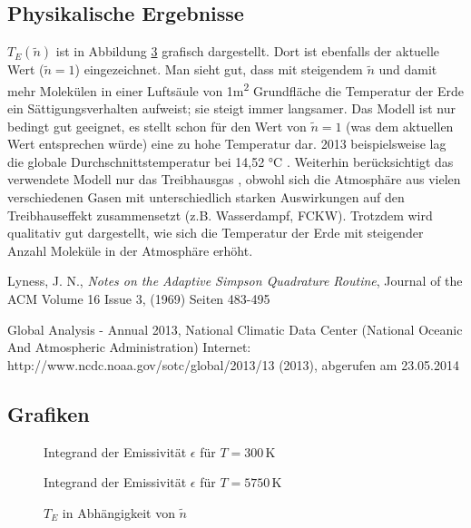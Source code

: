 \documentclass[10pt,a4paper]{article}
\begin{document}
\subsection{Physikalische Ergebnisse}
\label{ssec:physikalischeergebnisse}

$T_E(\tilde{n})$ ist in Abbildung \ref{fig:ergebnisse} grafisch dargestellt. Dort ist ebenfalls der aktuelle Wert ($\tilde{n}=1$) eingezeichnet. Man sieht gut, dass mit steigendem $\tilde{n}$ und damit mehr  Molekülen in einer Luftsäule von 1\si{\meter^2} Grundfläche die Temperatur der Erde ein Sättigungsverhalten aufweist; sie steigt immer langsamer. Das Modell ist nur bedingt gut geeignet, es stellt schon für den Wert von $\tilde{n}=1$ (was dem aktuellen Wert entsprechen würde) eine zu hohe Temperatur dar. 2013 beispielsweise lag die globale Durchschnittstemperatur bei 14,52 \si{\celsius} \cite{noaa}. Weiterhin berücksichtigt das verwendete Modell nur das Treibhausgas , obwohl sich die Atmosphäre aus vielen verschiedenen Gasen mit unterschiedlich starken Auswirkungen auf den Treibhauseffekt zusammensetzt (z.B. Wasserdampf, FCKW). Trotzdem wird qualitativ gut dargestellt, wie sich die Temperatur der Erde mit steigender Anzahl  Moleküle in der Atmosphäre erhöht.

\begin{thebibliography}{9}

 Lyness, J. N.,
 \emph{Notes on the Adaptive Simpson Quadrature Routine},
Journal of the ACM
Volume 16 Issue 3, (1969) 
Seiten 483-495 

Global Analysis - Annual 2013, National Climatic Data Center (National Oceanic And Atmospheric Administration) Internet: http://www.ncdc.noaa.gov/sotc/global/2013/13 (2013), abgerufen am 23.05.2014

\end{thebibliography}

\begin{appendix}
\section{Grafiken}

\begin{figure}[htbp]
\centering

\caption{Integrand der Emissivität $\epsilon$ für $T=300\, \si{\kelvin}$}
\label{fig:integrand300}
\end{figure}

\begin{figure}
\centering

\caption{Integrand der Emissivität $\epsilon$ für $T=5750\, \si{\kelvin}$}
\label{fig:integrand5750}
\end{figure}

\begin{figure}
\centering

\caption{$T_E$ in Abhängigkeit von $\tilde{n}$}
\label{fig:ergebnisse}
\end{figure}
\end{appendix}
\end{document}
